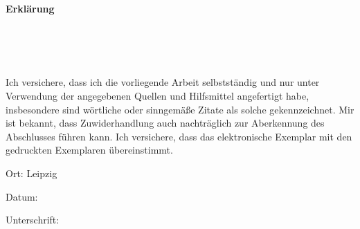 \documentclass[fontsize=12, a4aper]{scrartcl}
\newcommand\textbox[1]
{
	\parbox{.333\textwidth}{#1}
}
\begin{document}


\newpage

\listoftables

\listoffigures

\newpage

\appendix




\newpage

\begin{center}
	
	\fontsize{14pt}{12pt}
	
	\textbf{Erklärung}\\
	
\end{center}

\begin{verbatim}
	
	
	
\end{verbatim}

\noindent Ich versichere, dass ich die vorliegende Arbeit selbstständig und nur unter Verwendung der
angegebenen Quellen und Hilfsmittel angefertigt habe, insbesondere sind wörtliche oder
sinngemäße Zitate als solche gekennzeichnet. Mir ist bekannt, dass Zuwiderhandlung auch
nachträglich zur Aberkennung des Abschlusses führen kann.
Ich versichere, dass das elektronische Exemplar mit den gedruckten Exemplaren übereinstimmt.

\bigskip

\noindent\textbox{Ort: Leipzig\hfill}\textbox{\hfil Datum:\hfil}\textbox{\hfill Unterschrift:}
\end{document}
